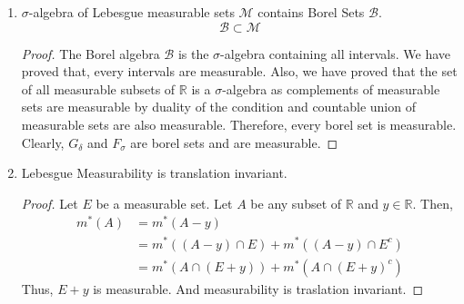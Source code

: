 \begin{enumerate}
\begin{proof}
	Let $A$ be any subset of $\mathbb{R}$.
	Define $A_1 = A\cap (-\infty,a)$ and $A_2 = A \cap (a,\infty)$ such that $A-\{a\} = A_1 \cup A_2$ and $A_1 \cap A_2 = \phi$.
	And the interval $(a,\infty)$ is measurable only if 
	\begin{equation}
		m^\ast(A) \ge m^\ast(A \cap (a,\infty)) + m^\ast(A \cap (a,\infty)^c) = m^\ast(A_1)+m^\ast(A_2)
		\dag\footnote{We have, $m^\ast(A \cap (-\infty,a]) = m^\ast(A \cap (-\infty,a)$ since removing finite number of points from a subset of $\mathbb{R}$ won't affect its measure.}
	\end{equation}
	Let collection $\{ I_k \}_{k=1}^\infty$ be a countable cover of $A$.
		Then collection $\{ I_k' \}_{k=1}^\infty$ defined by $I_k' = I_k \cap (a,\infty)$ is a cover of $A_1$.
		And collection $\{I_k''\}_{k=1}^\infty$ defined by $I_k'' = I_k \cap (-\infty,a)$ is a cover of $A_2$.\\

	Clearly, $m^\ast(A_1) \le \displaystyle\sum_{k=1}^\infty l(I_k')$ and $m^\ast(A_2) \le \displaystyle\sum_{k=1}^\infty l(I_k'')$.
	\begin{align*}
		m^\ast(A_1)+m^\ast(A_2) & \le \sum_{k=1}^\infty l(I_k') + \sum_{k=1}^\infty l(I_k'') \\
		& \le \sum_{k=1}^\infty l(I_k') + l(I_k'') \\
		& \le \sum_{k=1}^\infty l(I_k) \le m^\ast(A)
	\end{align*}
		Thus, $(a,\infty)$ is measurable.
		Therefore, every interval is measurable.
	\end{proof}
	\item $\sigma$-algebra of Lebesgue measurable sets $\mathcal{M}$ contains Borel Sets $\mathcal{B}$.
	\begin{equation}
		\mathcal{B} \subset \mathcal{M}
	\end{equation}
	\begin{proof}
	The Borel algebra $\mathcal{B}$ is the $\sigma$-algebra containing all intervals.
		We have proved that, every intervals are measurable.
		Also, we have proved that the set of all measurable subsets of $\mathbb{R}$ is a $\sigma$-algebra as complements of measurable sets are measurable by duality of the condition and countable union of measurable sets are also measurable.
		Therefore, every borel set is measurable.
		Clearly, $G_\delta$ and $F_\sigma$ are borel sets and are measurable.
	\end{proof}
	\item Lebesgue Measurability is translation invariant.
	\begin{proof}
		Let $E$ be a measurable set.
		Let $A$ be any subset of $\mathbb{R}$ and $y \in \mathbb{R}$.
		Then,
	\begin{align*}
		m^\ast(A) & = m^\ast(A-y)\\
		& = m^\ast((A-y) \cap E) + m^\ast((A-y) \cap E^c)\\
		& = m^\ast(A \cap (E+y)) + m^\ast(A \cap (E+y)^c)
	\end{align*}
		Thus, $E+y$ is measurable.
		And measurability is traslation invariant.
	\end{proof}
\end{enumerate}

